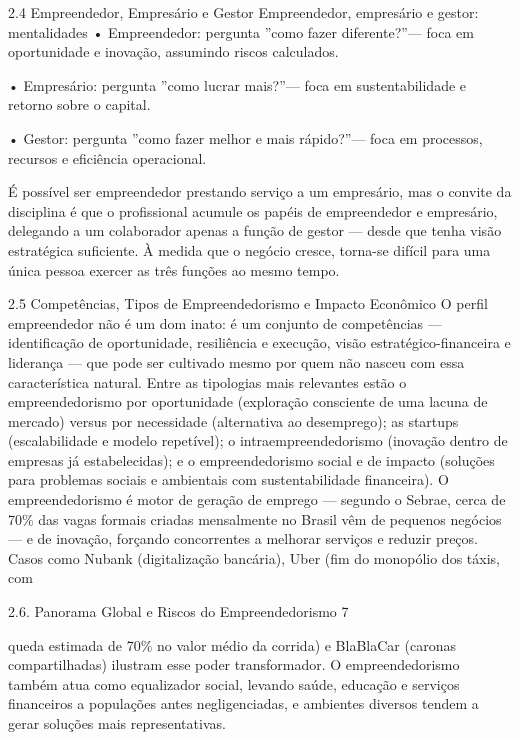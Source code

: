2.4 Empreendedor, Empresário e Gestor Empreendedor, empresário e gestor: mentalidades • Empreendedor: pergunta ”como fazer diferente?”— foca em oportunidade e inovação, assumindo riscos calculados.

• Empresário: pergunta ”como lucrar mais?”— foca em sustentabilidade e retorno sobre o capital.

• Gestor: pergunta ”como fazer melhor e mais rápido?”— foca em processos, recursos e eficiência operacional.

É possível ser empreendedor prestando serviço a um empresário, mas o convite da disciplina é que o profissional acumule os papéis de empreendedor e empresário, delegando a um colaborador apenas a função de gestor — desde que tenha visão estratégica suficiente. À medida que o negócio cresce, torna-se difícil para uma única pessoa exercer as três funções ao mesmo tempo.

2.5 Competências, Tipos de Empreendedorismo e Impacto Econômico O perfil empreendedor não é um dom inato: é um conjunto de competências — identificação de oportunidade, resiliência e execução, visão estratégico-financeira e liderança — que pode ser cultivado mesmo por quem não nasceu com essa característica natural. Entre as tipologias mais relevantes estão o empreendedorismo por oportunidade (exploração consciente de uma lacuna de mercado) versus por necessidade (alternativa ao desemprego); as startups (escalabilidade e modelo repetível); o intraempreendedorismo (inovação dentro de empresas já estabelecidas); e o empreendedorismo social e de impacto (soluções para problemas sociais e ambientais com sustentabilidade financeira). O empreendedorismo é motor de geração de emprego — segundo o Sebrae, cerca de 70\% das vagas formais criadas mensalmente no Brasil vêm de pequenos negócios — e de inovação, forçando concorrentes a melhorar serviços e reduzir preços. Casos como Nubank (digitalização bancária), Uber (fim do monopólio dos táxis, com

2.6. Panorama Global e Riscos do Empreendedorismo 7

queda estimada de 70\% no valor médio da corrida) e BlaBlaCar (caronas compartilhadas) ilustram esse poder transformador. O empreendedorismo também atua como equalizador social, levando saúde, educação e serviços financeiros a populações antes negligenciadas, e ambientes diversos tendem a gerar soluções mais representativas.

